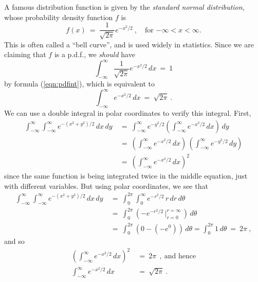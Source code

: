 \begin{exmp}\label{exmp:normaldistrib}
 A famous distribution function is given by the \emph{standard normal distribution}, whose probability density function
 $f$ is
 \begin{equation}\label{eqn:normalpdf}
  f(x) ~=~ \frac{1}{\sqrt{2\pi}} e^{-x^2 /2}~, \quad \text{for $-\infty < x < \infty$.}
 \end{equation}
 This is often called a ``bell curve'', and is used widely in statistics. Since we are claiming that $f$ is a p.d.f.,
 we \emph{should} have
 \begin{equation}
  \int_{-\infty}^{\infty} \frac{1}{\sqrt{2\pi}} e^{-x^2 /2}\,dx ~=~ 1
 \end{equation}
 by formula (\ref{eqn:pdfint}), which is equivalent to
 \begin{equation}
  \int_{-\infty}^{\infty} e^{-x^2 /2}\,dx ~=~ \sqrt{2\pi} ~.
 \end{equation}
 We can use a double integral in polar coordinates to verify this integral. First,
 \begin{align*}
  \int_{-\infty}^{\infty} \int_{-\infty}^{\infty} e^{-(x^2 + y^2 )/2}\,dx\,dy ~&=~
  \int_{-\infty}^{\infty} e^{-y^2 /2} \left( \int_{-\infty}^{\infty} e^{-x^2 /2}\,dx \right) \,dy\\[6pt]
  &=~ \left( \int_{-\infty}^{\infty} e^{-x^2 /2}\,dx \right)\,\left( \int_{-\infty}^{\infty} e^{-y^2 /2}\,dy \right)\\[6pt]
  &=~ \left( \int_{-\infty}^{\infty} e^{-x^2 /2}\,dx \right)^2
 \end{align*}
 since the same function is being integrated twice in the middle equation, just with different variables. But using
 polar coordinates, we see that
 \begin{align*}
  \int_{-\infty}^{\infty} \int_{-\infty}^{\infty} e^{-(x^2 + y^2 )/2}\,dx\,dy
  ~&=~ \int_0^{2\pi} \int_0^{\infty} e^{-r^2 /2}\,r\,dr\,d\theta\\[6pt]
  &=~ \int_0^{2\pi} \left( -e^{-r^2 /2} \,\Bigg|_{r=0}^{r=\infty} \,\right)\,d\theta\\[6pt]
  &=~ \int_0^{2\pi} (0 - (-e^0))\,d\theta = \int_0^{2\pi} 1\,d\theta ~=~ 2\pi ~,
 \end{align*}
 and so
 \begin{align*}
  \left( \int_{-\infty}^{\infty} e^{-x^2 /2}\,dx \right)^2 ~&=~ 2\pi ~~,~\text{and hence}\\[6pt]
  \int_{-\infty}^{\infty} e^{-x^2 /2}\,dx ~&=~ \sqrt{2\pi} ~.
 \end{align*}
\end{exmp}
